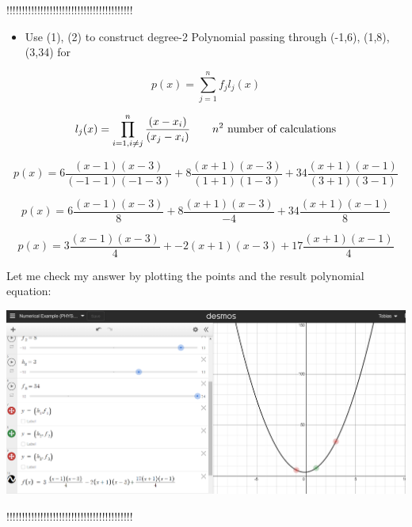 !!!!!!!!!!!!!!!!!!!!!!!!!!!!!!!!!!!!!!!!!
\begin{itemize}
    \item Use (1), (2) to construct degree-2 Polynomial passing through (-1,6), (1,8), (3,34) for 
\end{itemize}

\[p(x) = \sum_{j=1}^n f_j l_j(x) \]

\[l_j(x) = \prod_{i=1, \space i \neq j}^n \frac{(x-x_i)}{(x_j-x_i)} \qquad \text{$n^2$ number of calculations}\]

\[ p(x) = 6 \frac{(x-1)(x-3)}{(-1-1)(-1-3)} + 8 \frac{(x+1)(x-3)}{(1+1)(1-3)} + 34 \frac{(x+1)(x-1)}{(3+1)(3-1)}\]

\[ p(x) = 6 \frac{(x-1)(x-3)}{8} + 8 \frac{(x+1)(x-3)}{-4} + 34 \frac{(x+1)(x-1)}{8}\]

\[ p(x) = 3\frac{(x-1)(x-3)}{4} + -2 (x+1)(x-3) + 17 \frac{(x+1)(x-1)}{4}\]


Let me check my answer by plotting the points and the result polynomial equation:


\includegraphics[width = \linewidth]{Images/NumericalExample_LagrangePolyInterp.png}

!!!!!!!!!!!!!!!!!!!!!!!!!!!!!!!!!!!!!!!!!

